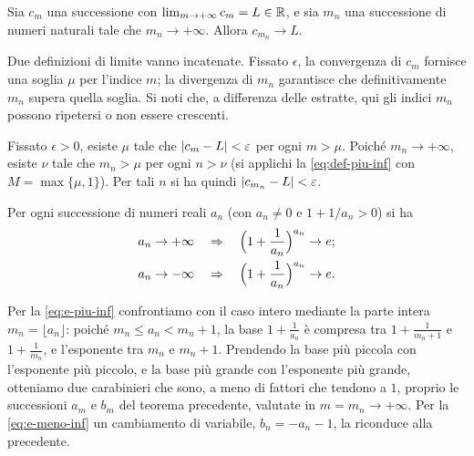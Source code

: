 \begin{lemma}\label{lem:composizione-indici}
Sia $c_{m}$ una successione con $\lim_{m\to+\infty}c_{m}=L\in\mathbb{R}$, e sia $m_{n}$ una
successione di numeri naturali tale che $m_{n}\to+\infty$. Allora $c_{m_{n}}\to L$.
\end{lemma}

\begin{schema}
\end{schema}

\begin{strategia}
Due definizioni di limite vanno incatenate. Fissato $\epsilon$, la convergenza di $c_{m}$
fornisce una soglia $\mu$ per l'indice $m$; la divergenza di $m_{n}$ garantisce che
definitivamente $m_{n}$ supera quella soglia. Si noti che, a differenza delle estratte,
qui gli indici $m_{n}$ possono ripetersi o non essere crescenti.
\end{strategia}

\begin{dimostrazione}
Fissato $\epsilon>0$, esiste $\mu$ tale che $\lvert c_{m}-L\rvert<\varepsilon$ per ogni $m>\mu$.
Poiché $m_{n}\to+\infty$, esiste $\nu$ tale che $m_{n}>\mu$ per ogni $n>\nu$ (si applichi
la \eqref{eq:def-piu-inf} con $M=\max\{\mu,1\}$). Per tali $n$ si ha quindi
$\lvert c_{m_{n}}-L\rvert<\varepsilon$.
\end{dimostrazione}

\begin{teorema}\label{teo:e-generalizzato}
Per ogni successione di numeri reali $a_{n}$ (con $a_{n}\neq0$ e $1+1/a_{n}>0$) si ha
\begin{align}
  a_{n}\to+\infty \quad&\Rightarrow\quad \Bigl(1+\frac1{a_{n}}\Bigr)^{a_{n}}\to e; \label{eq:e-piu-inf}\\
  a_{n}\to-\infty \quad&\Rightarrow\quad \Bigl(1+\frac1{a_{n}}\Bigr)^{a_{n}}\to e. \label{eq:e-meno-inf}
\end{align}
\end{teorema}

\begin{schema}
\end{schema}

\begin{strategia}
Per la \eqref{eq:e-piu-inf} confrontiamo con il caso intero mediante la parte intera
$m_{n}=\lfloor a_{n}\rfloor$: poiché $m_{n}\le a_{n}<m_{n}+1$, la base $1+\frac1{a_{n}}$ è
compresa tra $1+\frac1{m_{n}+1}$ e $1+\frac1{m_{n}}$, e l'esponente tra $m_{n}$ e
$m_{n}+1$. Prendendo la base più piccola con l'esponente più piccolo, e la base più
grande con l'esponente più grande, otteniamo due carabinieri che sono, a meno di
fattori che tendono a $1$, proprio le successioni $a_{m}$ e $b_{m}$ del teorema
precedente, valutate in $m=m_{n}\to+\infty$. Per la \eqref{eq:e-meno-inf} un cambiamento
di variabile, $b_{n}=-a_{n}-1$, la riconduce alla precedente.
\end{strategia}

